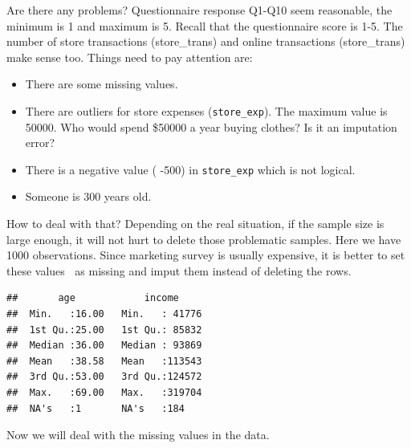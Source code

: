 \documentclass[]{book}
\newenvironment{Shaded}{\begin{snugshade}}{\end{snugshade}}
\newcommand{\KeywordTok}[1]{\textcolor[rgb]{0.13,0.29,0.53}{\textbf{{#1}}}}
\newcommand{\DataTypeTok}[1]{\textcolor[rgb]{0.13,0.29,0.53}{{#1}}}
\newcommand{\DecValTok}[1]{\textcolor[rgb]{0.00,0.00,0.81}{{#1}}}
\newcommand{\StringTok}[1]{\textcolor[rgb]{0.31,0.60,0.02}{{#1}}}
\newcommand{\CommentTok}[1]{\textcolor[rgb]{0.56,0.35,0.01}{\textit{{#1}}}}
\newcommand{\OtherTok}[1]{\textcolor[rgb]{0.56,0.35,0.01}{{#1}}}
\newcommand{\NormalTok}[1]{{#1}}
\providecommand{\tightlist}{%
  \setlength{\itemsep}{0pt}\setlength{\parskip}{0pt}}
\theoremstyle{definition}
\theoremstyle{definition}
\theoremstyle{remark}
\begin{document}
Are there any problems? Questionnaire response Q1-Q10 seem reasonable,
the minimum is 1 and maximum is 5. Recall that the questionnaire score
is 1-5. The number of store transactions (store\_trans) and online
transactions (store\_trans) make sense too. Things need to pay attention
are:

\begin{itemize}
\tightlist
\item
  There are some missing values.
\item
  There are outliers for store expenses (\texttt{store\_exp}). The
  maximum value is 50000. Who would spend \$50000 a year buying clothes?
  Is it an imputation error?
\item
  There is a negative value ( -500) in \texttt{store\_exp} which is not
  logical.
\item
  Someone is 300 years old.
\end{itemize}

How to deal with that? Depending on the real situation, if the sample
size is large enough, it will not hurt to delete those problematic
samples. Here we have 1000 observations. Since marketing survey is
usually expensive, it is better to set these values as missing and
imput them instead of deleting the rows.

\begin{Shaded}
\end{Shaded}

\begin{verbatim}
##       age            income      
##  Min.   :16.00   Min.   : 41776  
##  1st Qu.:25.00   1st Qu.: 85832  
##  Median :36.00   Median : 93869  
##  Mean   :38.58   Mean   :113543  
##  3rd Qu.:53.00   3rd Qu.:124572  
##  Max.   :69.00   Max.   :319704  
##  NA's   :1       NA's   :184
\end{verbatim}

Now we will deal with the missing values in the data.
\end{document}
